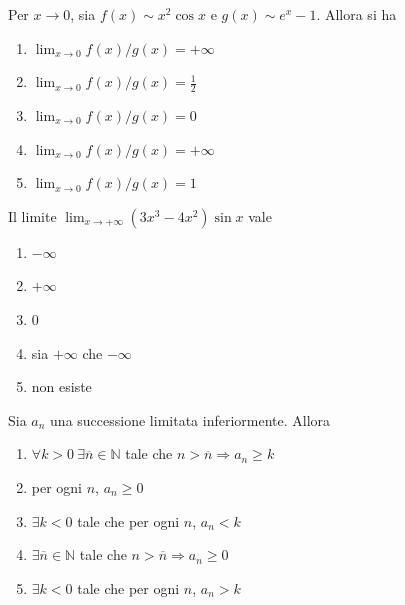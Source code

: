 \begin{quiz}
Per $x\to0$, sia $f(x)\sim x^2\cos x$ e $g(x)\sim e^x-1$. Allora si ha
\begin{enumerate}
\item $\lim_{x\to0}f(x)/g(x)=+\infty$
\item $\lim_{x\to0}f(x)/g(x)=\frac12$
\item $\lim_{x\to0}f(x)/g(x)=0$
\item $\lim_{x\to0}f(x)/g(x)=+\infty$
\item $\lim_{x\to0}f(x)/g(x)=1$
\end{enumerate}
\end{quiz}

\begin{quiz}
Il limite $\displaystyle\lim_{x\to+\infty}(3x^3-4x^2)\sin x$ vale
\begin{enumerate}
\item $-\infty$
\item $+\infty$
\item $0$
\item sia $+\infty$ che $-\infty$
\item non esiste
\end{enumerate}
\end{quiz}

\begin{quiz}
Sia $a_n$ una successione limitata inferiormente. Allora
\begin{enumerate}
\item $\forall k>0\ \exists\overline n\in\mathbb N$ tale che $n>\overline n\Rightarrow a_n\ge k$
\item per ogni $n$, $a_n\ge0$
\item $\exists k<0$ tale che per ogni $n$, $a_n<k$
\item $\exists\overline n\in\mathbb N$ tale che $n>\overline n\Rightarrow a_n\ge0$
\item $\exists k<0$ tale che per ogni $n$, $a_n>k$
\end{enumerate}
\end{quiz}

